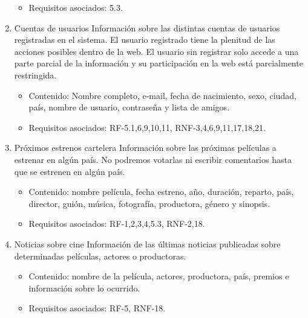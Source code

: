 \documentclass{article}
\begin{document}
\begin{enumerate}[label=\bfseries RI- \arabic*:]
\begin{itemize}
        \item Requisitos asociados: 5.3.
        \end{itemize}
    \item Cuentas de usuarios Información sobre las distintas cuentas de usuarios registradas en el sistema. El usuario registrado tiene la plenitud de las acciones posibles dentro de la web. El usuario sin registrar solo accede a una parte parcial de la información y su participación en la web está parcialmente restringida.
        \begin{itemize}
        \item Contenido: Nombre completo, e-mail, fecha de nacimiento, sexo, ciudad, país, nombre de usuario, contraseña y lista de amigos.

        \item Requisitos asociados: RF-5.1,6,9,10,11, RNF-3,4,6,9,11,17,18,21.
        \end{itemize}
    \item Próximos estrenos cartelera Información sobre las próximas películas a estrenar en algún país. No podremos votarlas ni escribir comentarios hasta que se estrenen en algún país.
        \begin{itemize}
        \item Contenido: nombre película, fecha estreno, año, duración, reparto, país, director, guión, música, fotografía, productora, género y sinopsis.

        \item Requisitos asociados: RF-1,2,3,4,5.3, RNF-2,18.
        \end{itemize}
    \item Noticias sobre cine Información de las últimas noticias publicadas sobre determinadas películas, actores o productoras.
        \begin{itemize}
        \item Contenido: nombre de la película, actores, productora, país, premios e información sobre lo ocurrido.

        \item Requisitos asociados: RF-5, RNF-18.
        \end{itemize}
    \end{enumerate}
\end{document}
